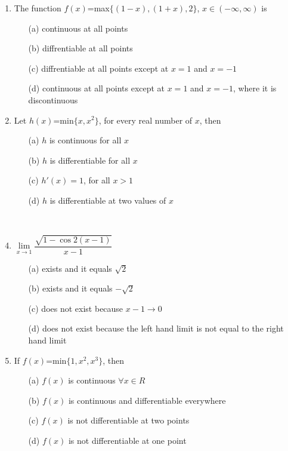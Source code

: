 \documentclass[journal,12pt,twocolumn]{IEEEtran}
\begin{document}
\begin{enumerate}
\item The function $f(x)$=max$\{(1-x),(1+x),2\}$, $x \in(-\infty,\infty)$ is
\begin{itemize}
\item[(a)] continuous at all points
\item[(b)] diffrentiable at all points
\item[(c)] diffrentiable at all points except at $x=1$ and $x=-1$
\item[(d)] continuous at all points except at $x=1$ and $x=-1$, where it is discontinuous\\
\end{itemize}

\item Let $h(x)$=min$\{x,x^2\}$, for every real number of $x$, then
\begin{itemize}
\item[(a)] $h$ is continuous for all $x$
\item[(b)] $h$ is differentiable for all $x$
\item[(c)] $h'(x)=1$, for all $x>1$
\item[(d)] $h$ is differentiable at two values of $x$
\end{itemize}

\item[~] \item $\lim\limits_{x \to 1}\dfrac{\sqrt{1-\cos 2(x-1)}}{x-1}$
\begin{itemize}
\item[(a)] exists and it equals $\sqrt{2}$
\item[(b)] exists and it equals $-\sqrt{2}$
\item[(c)] does not exist because $x-1 \to 0$
\item[(d)] does not exist because the left hand limit is not equal to the right hand limit\\
\end{itemize}

\item If $f(x)$=min$\{1,x^2,x^3\}$, then
\begin{itemize}
\item[(a)] $f(x)$ is continuous $\forall x \in R$
\item[(b)] $f(x)$ is continuous and differentiable everywhere
\item[(c)] $f(x)$ is not differentiable at two points
\item[(d)] $f(x)$ is not differentiable at one point
\end{itemize}


\end{enumerate}
\end{document}
